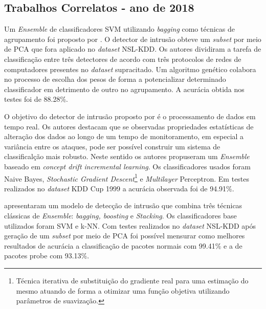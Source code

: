 
















\subsection{Trabalhos Correlatos - ano de 2018}
\label{trab_correlatos_18}





 Um \textit{Ensemble} de classificadores SVM utilizando \textit{bagging} como técnicas de agrupamento foi proposto por . O detector de intrusão obteve um \textit{subset} por meio de PCA que fora aplicado no \textit{dataset} NSL-KDD. Os autores dividiram a tarefa de classificação entre três detectores de acordo com três protocolos de redes de computadores presentes no \textit{dataset} supracitado. Um algoritmo genético colabora no processo de escolha dos pesos de forma a potencializar determinado classificador em detrimento de outro no agrupamento. A acurácia obtida nos testes foi de 88.28\%.
 

O objetivo do detector de intrusão proposto por  é o processamento de dados em tempo real. Os autores destacam que se observadas propriedades estatísticas de alteração dos dados ao longo de um tempo de monitoramento, em especial a variância entre os ataques, pode ser possível construir um sistema de classificalção mais robusto. Neste sentido os autores propuseram um \textit{Ensemble} baseado em \textit{concept drift incremental learning}. Os classificadores usados foram Naive Bayes, \textit{Stochastic Gradient Descent}\footnote{Técnica iterativa de substituição do gradiente real para uma estimação do mesmo atuando de forma a otimizar uma função objetiva utilizando parâmetros de suavização.} e \textit{Multilayer} Perceptron. Em testes realizados no \textit{dataset} KDD Cup 1999 a acurácia observada foi de 94.91\%.

 apresentaram um modelo de detecção de intrusão que combina três técnicas clássicas de \textit{Ensemble}: \textit{bagging, boosting} e \textit{Stacking}. Os classificadores base utilizados foram SVM e k-NN. Com testes realizados no \textit{dataset} NSL-KDD após geração de um \textit{subset} por meio de PCA foi possível mensurar como melhores resultados de acurácia a classificação de pacotes normais com 99.41\% e a de pacotes probe com 93.13\%.

